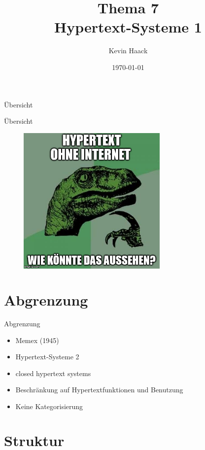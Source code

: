 \documentclass{beamer}
\title{Thema 7\\Hypertext-Systeme 1}
\author{Kevin Haack}
\institute{Universität Paderborn}
\date{\today}
\begin{document}
\begin{frame}
  \titlepage
\end{frame}

\begin{frame}{Übersicht}
\tableofcontents
\end{frame}

\begin{frame}{Übersicht}
	\begin{figure}[htbp]
		\centering
		\includegraphics[width=0.65\textwidth]{images/philosoraptor}
	\end{figure}
\end{frame}

\section{Abgrenzung}
\begin{frame}{Abgrenzung}
	\begin{itemize}
		\item Memex (1945)
		\item Hypertext-Systeme 2
		\item closed hypertext systems
		\item Beschränkung auf Hypertextfunktionen und Benutzung
		\item Keine Kategorisierung
	\end{itemize}
\end{frame}



\section{Struktur}
\end{document}
